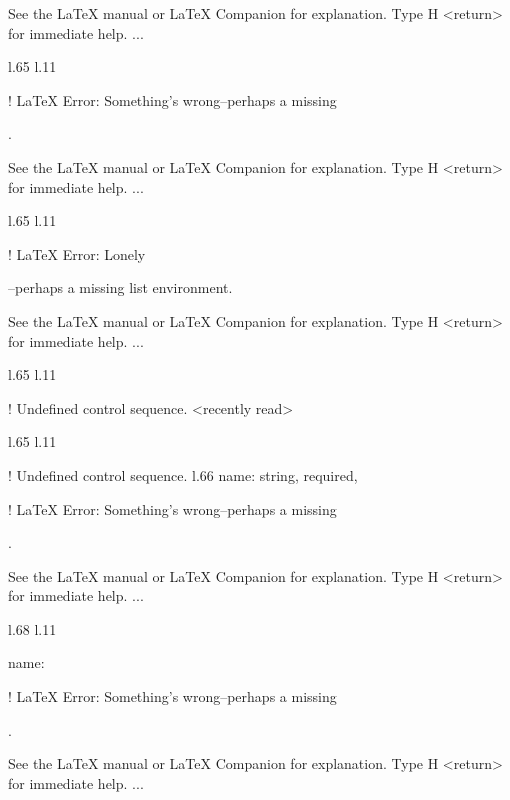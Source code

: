 {{{{See the LaTeX manual or LaTeX Companion for explanation.
Type  H <return>  for immediate help.
 ...                                              
                                                  
l.65 l.11       \item \xmlAttr
                              

! LaTeX Error: Something's wrong--perhaps a missing \item.

See the LaTeX manual or LaTeX Companion for explanation.
Type  H <return>  for immediate help.
 ...                                              
                                                  
l.65 l.11       \item \xmlAttr
                              

! LaTeX Error: Lonely \item--perhaps a missing list environment.

See the LaTeX manual or LaTeX Companion for explanation.
Type  H <return>  for immediate help.
 ...                                              
                                                  
l.65 l.11       \item \xmlAttr
                              
! Undefined control sequence.
<recently read> \xmlAttr 
                         
l.65 l.11       \item \xmlAttr
                              
! Undefined control sequence.
l.66                          {name}: \xmlDesc
                                              {string, required},

! LaTeX Error: Something's wrong--perhaps a missing \item.

See the LaTeX manual or LaTeX Companion for explanation.
Type  H <return>  for immediate help.
 ...                                              
                                                  
l.68 l.11       \item \xmlAttr
                              {name}: \xmlDesc

! LaTeX Error: Something's wrong--perhaps a missing \item.

See the LaTeX manual or LaTeX Companion for explanation.
Type  H <return>  for immediate help.
 ...                                              
                                                  
}}}}
